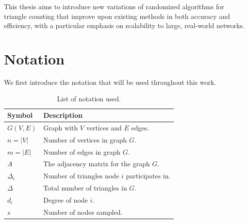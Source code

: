 \documentclass[11pt, margin=1in]{article}
\begin{document}
This thesis aims to introduce new variations of randomized algorithms for triangle counting that improve upon existing methods in both accuracy and efficiency, with a particular emphasis on scalability to large, real-world networks.

\newpage

\section{Notation}

We first introduce the notation that will be used throughout this work.

\begin{table}[ht]
    \centering
    \caption{List of notation used.}
    \begin{tabular}{ll}
        \toprule
        \textbf{Symbol} & \textbf{Description} \\
        \midrule
        $G(V, E)$       & Graph with $V$ vertices and $E$ edges. \\
        $n = |V|$       & Number of vertices in graph $G$. \\
        $m = |E|$       & Number of edges in graph $G$. \\
        $A$             & The adjacency matrix for the graph $G$. \\
        $\Delta_i$      & Number of triangles node $i$ participates in. \\
        $\Delta$        & Total number of triangles in $G$. \\
        $d_i$           & Degree of node $i$. \\
        $s$             & Number of nodes sampled. \\
        \bottomrule
    \end{tabular}
    \label{tab:notation}
\end{table}
\end{document}
